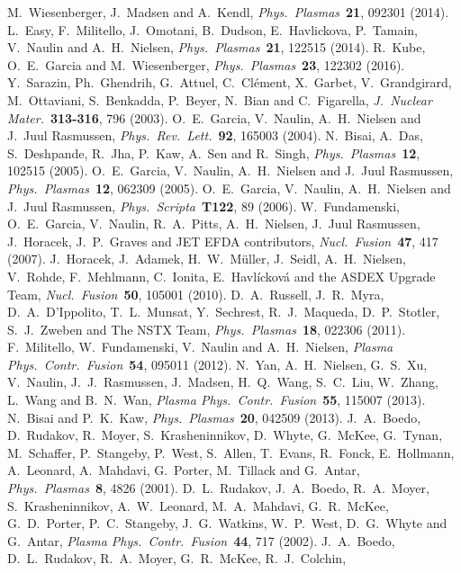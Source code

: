 \documentclass[aps,prb,12pt,a4paper,preprint,amsmath,amssymb,groupedaddress]{revtex4-1}
\newcommand{\JNM}{\textit{J.~Nuclear Mater.}}
\newcommand{\NF}{\textit{Nucl.\ Fusion}}
\newcommand{\PPCF}{\textit{Plasma Phys.\ Contr.\ Fusion}}
\newcommand{\PP}{\textit{Phys.\ Plasmas}}
\newcommand{\PS}{\textit{Phys.\ Scripta}}
\newcommand{\PRL}{\textit{Phys.~Rev.\ Lett.}}
\begin{document}
\begin{thebibliography}{99}
M.~Wiesenberger, J.~Madsen and A.~Kendl, \PP\ {\bf 21}, 092301 (2014).
%
L.~Easy, F.~Militello, J.~Omotani, B.~Dudson, E.~Havlickova, P.~Tamain, V.~Naulin and A.~H.~Nielsen, \PP\ {\bf 21}, 122515 (2014).
%
R.~Kube, O.~E.~Garcia and M.~Wiesenberger, \PP\ {\bf 23}, 122302 (2016).
%
%
Y.~Sarazin, Ph.~Ghendrih, G.~Attuel, C.~Cl{\'e}ment, X.~Garbet, V.~Grandgirard, M.~Ottaviani, S.~Benkadda, P.~Beyer, N.~Bian and C.~Figarella, \JNM\ {\bf 313-316}, 796 (2003).
%
O.~E.~Garcia, V.~Naulin, A.~H.~Nielsen and J.~Juul Rasmussen, \PRL\ {\bf 92}, 165003 (2004).
%
N.~Bisai, A.~Das, S.~Deshpande, R.~Jha, P.~Kaw, A.~Sen and R.~Singh, \PP\ {\bf 12}, 102515 (2005).
%
O.~E.~Garcia, V.~Naulin, A.~H.~Nielsen and J.~Juul Rasmussen, \PP\ {\bf 12}, 062309 (2005).
%
O.~E.~Garcia, V.~Naulin, A.~H.~Nielsen and J.~Juul Rasmussen, \PS\ {\bf T122}, 89 (2006).
%
W.~Fundamenski, O.~E.~Garcia, V.~Naulin, R.~A.~Pitts,
A.~H.~Nielsen, J.~Juul Rasmussen, J.~Horacek, J.~P.~Graves and JET EFDA contributors, \NF\ {\bf 47}, 417 (2007).
%
J.~Horacek, J.~Adamek, H.~W.~M{\"u}ller, J.~Seidl, A.~H.~Nielsen, V.~Rohde, F.~Mehlmann, C.~Ionita, E.~Havl{\'i}ckov{\'a} and the ASDEX Upgrade Team, \NF\ {\bf 50}, 105001 (2010).
%
D.~A.~Russell,  J.~R.~Myra, D.~A.~D’{I}ppolito, T.~L.~Munsat, Y.~Sechrest, R.~J.~Maqueda, D.~P.~Stotler, S.~J.~Zweben and The NSTX Team, \PP\ {\bf 18}, 022306 (2011).
%
F.~Militello, W.~Fundamenski, V.~Naulin and A.~H.~Nielsen, \PPCF\ {\bf 54}, 095011 (2012).
%
N.~Yan, A.~H.~Nielsen, G.~S.~Xu, V.~Naulin, J.~J.~Rasmussen, J.~Madsen, H.~Q.~Wang, S.~C.~Liu, W.~Zhang, L.~Wang and B.~N.~Wan, \PPCF\ {\bf 55}, 115007 (2013).
%
N.~Bisai and P.~K.~Kaw, \PP\ {\bf 20}, 042509 (2013).
%
%
J.~A.~Boedo, D.~Rudakov, R.~Moyer, S.~Krasheninnikov, D.~Whyte, G.~McKee, G.~Tynan, M.~Schaffer, P.~Stangeby, P.~West, S.~Allen, T.~Evans, R.~Fonck, E.~Hollmann, A.~Leonard, A.~Mahdavi, G.~Porter, M.~Tillack and G.~Antar, \PP\ {\bf 8}, 4826 (2001).
%
D.~L.~Rudakov, J.~A.~Boedo, R.~A.~Moyer, S.~Krasheninnikov, A.~W.~Leonard, M.~A.~Mahdavi, G.~R.~Mc{K}ee, G.~D.~Porter, P.~C.~Stangeby, J.~G.~Watkins, W.~P.~West, D.~G.~Whyte and G.~Antar, \PPCF\ {\bf 44}, 717 (2002).
%
J.~A.~Boedo, D.~L.~Rudakov, R.~A.~Moyer, G.~R.~Mc{K}ee, R.~J.~Colchin,

\end{thebibliography}
\end{document}
